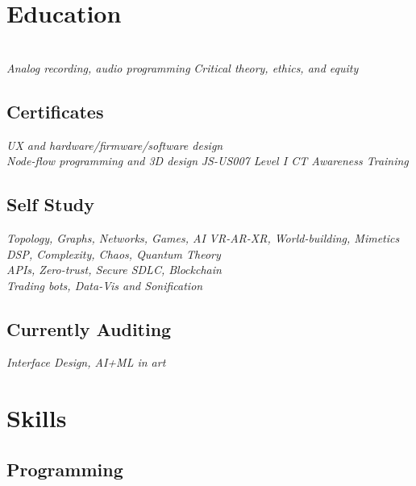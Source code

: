 \documentclass[]{quinnJarvisHollandLatex}
\begin{document}
\begin{minipage}[t]{0.33\textwidth}


\section{Education} 

\\
\textit{Analog recording, audio programming}
\textit{Critical theory, ethics, and equity} 
\subsection{Certificates}
\textit{UX and hardware/firmware/software design}\\
\textit{Node-flow programming and 3D design}
\textit{JS-US007 Level I CT Awareness Training}
\subsection{Self Study}
\textit{Topology, Graphs, Networks, Games, AI}
\textit{VR-AR-XR, World-building, Mimetics}\\
\textit{DSP, Complexity, Chaos, Quantum Theory}\\
\textit{APIs, Zero-trust, Secure SDLC, Blockchain}\\
\textit{Trading bots, Data-Vis and Sonification}
\subsection{Currently Auditing} 
\textit{Interface Design, AI+ML in art} 
\section{Skills}
\subsection{Programming}
\\
    \\
   \\



\end{minipage}
\end{document}
